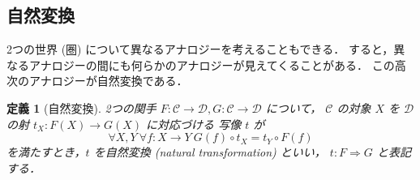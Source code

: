 \documentclass[titlepage]{ltjsarticle}
\newcommand{\cat}[1]{\mathscr{#1}}
\theoremstyle{plain}
\newtheorem{definition}{定義}[section]
\begin{document}
\subsection{自然変換}

2つの世界 (圏) について異なるアナロジーを考えることもできる．
すると，異なるアナロジーの間にも何らかのアナロジーが見えてくることがある．
この高次のアナロジーが自然変換である．

\begin{definition}[自然変換]
  2つの関手 $F:\cat{C}\to\cat{D},G:\cat{C}\to\cat{D}$ について，
  $\cat{C}$ の対象 $X$ を $\cat{D}$ の射 $t_X:F(X)\to G(X)$ に対応づける
  写像 $t$ が
  \begin{equation}
    \forall X,Y\ \forall f:X\to Y\ G(f)\circ t_X=t_Y\circ F(f)
  \end{equation}
  を満たすとき，$t$ を自然変換 (natural transformation) といい，
  $t:F\Rightarrow G$ と表記する．
\end{definition}
\end{document}
